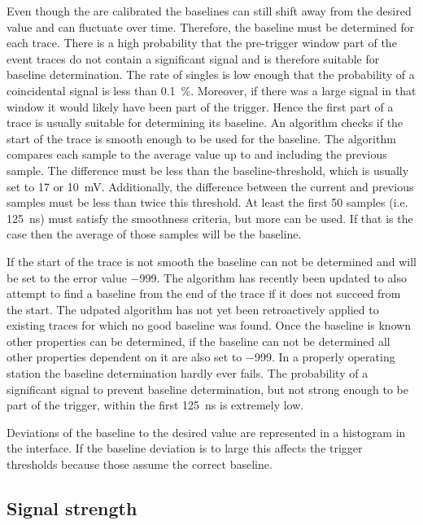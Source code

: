 Even though the \adcs are calibrated the baselines can still shift away from the desired value and can fluctuate over time. Therefore, the baseline must be determined for each trace. There is a high probability that the pre-trigger window part of the event traces do not contain a significant signal and is therefore suitable for baseline determination. The rate of singles is low enough that the probability of a coincidental signal is less than \SI{0.1}{\percent}. Moreover, if there was a large signal in that window it would likely have been part of the trigger. Hence the first part of a trace is usually suitable for determining its baseline. An algorithm checks if the start of the trace is smooth enough to be used for the baseline. The algorithm compares each sample to the average value up to and including the previous sample. The difference must be less than the baseline-threshold, which is usually set to \SI{17}{\adc} or \SI{10}{\milli\volt}. Additionally, the difference between the current and previous samples must be less than twice this threshold. At least the first 50 samples (i.e. \SI{125}{\ns}) must satisfy the smoothness criteria, but more can be used. If that is the case then the average of those samples will be the baseline.

If the start of the trace is not smooth the baseline can not be determined and will be set to the error value \num{-999}. The algorithm has recently been updated to also attempt to find a baseline from the end of the trace if it does not succeed from the start. The udpated algorithm has not yet been retroactively applied to existing traces for which no good baseline was found. Once the baseline is known other properties can be determined, if the baseline can not be determined all other properties dependent on it are also set to \num{-999}. In a properly operating station the baseline determination hardly ever fails. The probability of a significant signal to prevent baseline determination, but not strong enough to be part of the trigger, within the first \SI{125}{\ns} is extremely low.

Deviations of the baseline to the desired value are represented in a histogram in the \hisparc \daq interface. If the baseline deviation is to large this affects the trigger thresholds because those assume the correct baseline.


\subsection{Signal strength}

